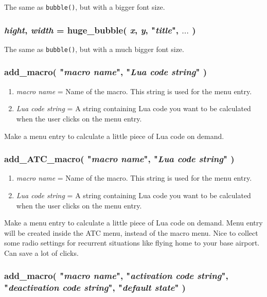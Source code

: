 \documentclass[11pt,parskip=half,a4paper]{scrartcl}
\begin{document}
The same as \verb|bubble()|, but with a bigger font size.

\subsubsection{\emph{hight}, \emph{width} = huge\_bubble( \emph{x}, \emph{y}, "\emph{title}", $\dots$ )}

The same as \verb|bubble()|, but with a much bigger font size.



\subsubsection{add\_macro( "\emph{macro name}", "\emph{Lua code string}" )}

\begin{enumerate}
	\item \emph{macro name} = Name of the macro. This string is used for the menu entry.
	\item \emph{Lua code string} = A string containing Lua code you want to be calculated when the user clicks on the menu entry.
\end{enumerate}

Make a menu entry to calculate a little piece of Lua code on demand.

\subsubsection{add\_ATC\_macro( "\emph{macro name}", "\emph{Lua code string}" )}

\begin{enumerate}
	\item \emph{macro name} = Name of the macro. This string is used for the menu entry.
	\item \emph{Lua code string} = A string containing Lua code you want to be calculated when the user clicks on the menu entry.
\end{enumerate}

Make a menu entry to calculate a little piece of Lua code on demand. Menu entry will be created inside the ATC menu, instead of the macro menu. Nice to collect some radio settings for recurrent situations like flying home to your base airport. Can save a lot of clicks.

\subsubsection{add\_macro( "\emph{macro name}", "\emph{activation code string}", "\emph{deactivation code string}", "\emph{default state}" )}
\end{document}
